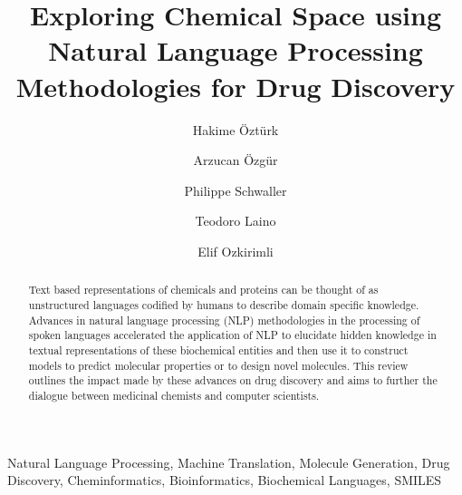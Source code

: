 \documentclass[review]{elsarticle}
\begin{document}
\begin{frontmatter}

\title{Exploring Chemical Space using Natural Language Processing Methodologies for Drug Discovery}




\author[cmpe]{Hakime \"{O}zt\"{u}rk}
\author[cmpe]{Arzucan \"{O}zg\"{u}r}
\author[IBM]{Philippe Schwaller}
\author[IBM]{Teodoro Laino }
\author[che,zurich]{Elif Ozkirimli }

\address[cmpe]{Department of Computer Engineering, Bogazici University, Istanbul, Turkey}
\address[IBM] {IBM Research, Zurich, Switzerland}
\address[che]{Department of Chemical Engineering, Bogazici University, Istanbul, Turkey}
\address[zurich]{Department of Biochemistry, University of Zurich, Winterthurerstrasse 190, CH-8057 Zurich, Switzerland}

\begin{keyword}
Natural Language Processing, Machine Translation, Molecule Generation, Drug Discovery, Cheminformatics, Bioinformatics, Biochemical Languages, SMILES
\end{keyword}

\begin{abstract}
Text based representations of chemicals and proteins can be thought of as unstructured languages codified by humans to describe domain specific knowledge. Advances in natural language processing (NLP) methodologies in the processing of spoken languages accelerated the application of NLP to elucidate hidden knowledge in textual representations of these biochemical entities and then use it to construct models to predict molecular properties or to design novel molecules. This review outlines the impact made by these advances on drug discovery and aims to further the dialogue between medicinal chemists and computer scientists.



\end{abstract}
\end{frontmatter}
\end{document}
